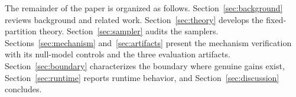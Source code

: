 The remainder of the paper is organized as follows.
Section~\ref{sec:background} reviews background and related work.
Section~\ref{sec:theory} develops the fixed-partition theory.
Section~\ref{sec:sampler} audits the samplers.
Sections~\ref{sec:mechanism} and~\ref{sec:artifacts} present the mechanism verification with its null-model controls and the three evaluation artifacts.
Section~\ref{sec:boundary} characterizes the boundary where genuine gains exist, Section~\ref{sec:runtime} reports runtime behavior, and Section~\ref{sec:discussion} concludes.
